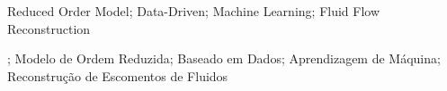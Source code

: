 \documentclass[dscexam, EN]{ufabcFHZh}
\begin{document}

\maketitle

\frontmatter

\dedication{I dedicate it to everyone who deserves it.}

\begin{agradecimentos}
	
\end{agradecimentos}

\begin{epigrafe}
	
\end{epigrafe}

\begin{foreignabstract}
	
\end{foreignabstract}
\keywordeng
{Reduced Order Model};
{Data-Driven};
{Machine Learning};
{Fluid Flow Reconstruction}

\begin{abstract}
	
\end{abstract}
;
{Modelo de Ordem Reduzida};
{Baseado em Dados};
{Aprendizagem de Máquina};
{Reconstrução de Escomentos de Fluidos}

\listoffigures
\end{document}

